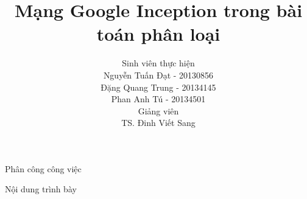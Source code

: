 \documentclass[compress]{beamer}
\title[Mạng Google Inception]{Mạng Google Inception trong bài toán phân loại}
\author[Nguyễn Tuấn Đạt, Đặng Quang Trung, Phan Anh Tú]{
Sinh viên thực hiện\\
Nguyễn Tuấn Đạt - 20130856\\
Đặng Quang Trung - 20134145\\
Phan Anh Tú - 20134501 \\[0.4cm]
Giảng viên \\
TS. Đinh Viết Sang 
}
\begin{document}
 
\begin{frame}
\titlepage
\end{frame} 

\begin{frame}{Phân công công việc}

\end{frame}
  
   
\begin{frame}{Nội dung trình bày}
\tableofcontents
\end{frame}
\end{document}

